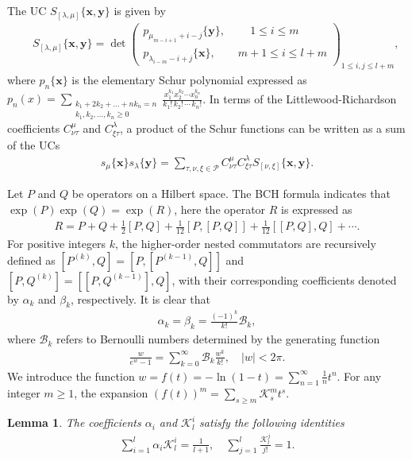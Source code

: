\documentclass[11pt,reqno]{amsart}
\numberwithin{equation}{section}
\newtheorem{lemma}[theorem]{Lemma}
\begin{document}
The UC $S_{[\lambda,\mu]}\{\mathbf{x,y}\}$ is given by
\begin{eqnarray}
&&S_{[\lambda,\mu]}\{\mathbf{x,y}\}=\det
\left(\begin{array}{lll}
p_{\mu_{m-i+1}+i-j}\{\mathbf{y}\},\quad \quad  \ 1\leq i\leq m\\
p_{\lambda_{i-m}-i+j}\{\mathbf{x}\},\quad \quad m+1\leq i\leq l+m
\end{array}\right)_{1\leq i,j\leq l+m},
\end{eqnarray}
where $p_{n}\{\mathbf{x}\}$ is the elementary Schur polynomial expressed as $p_n(x) = \sum\limits_{\substack{k_1 + 2k_2 + \dots + n k_n = n \\ k_1, k_2, \dots, k_n \ge 0}} \frac{x_1^{k_1} x_2^{k_2} \cdots x_n^{k_n}}{k_1! \, k_2! \, \cdots \, k_n!}$. In terms of the Littlewood-Richardson coefficients $C^{\mu}_{\nu\tau}$ and $C^{\lambda}_{\xi\tau}$, a product of the Schur functions can be written as a sum of the UCs
\begin{eqnarray}
s_{\mu}\{\mathbf{x}\}s_{\lambda}\{\mathbf{y}\}=
\sum\limits_{\tau,\nu,\xi\in\mathcal{P}}C^{\mu}_{\nu\tau}C^{\lambda}_{\xi\tau}
S_{[\nu,\xi]}\{\mathbf{x},\mathbf{y}\}.
\end{eqnarray}



 Let $P$ and $Q$ be operators on a Hilbert space. The BCH formula  indicates that $\exp(P)\exp(Q)=\exp(R)$, here the operator $R$ is expressed as
\begin{eqnarray}
R=P+Q+\frac{1}{2}[P,Q]+\frac{1}{12}[P,[P,Q]]+\frac{1}{12}[[P,Q],Q]+\cdots.
\end{eqnarray}
For positive integers $k$, the higher-order nested commutators are recursively defined as $[P^{(k)},Q]=[P,[P^{(k-1)},Q]]$ and $[P,Q^{(k)}]=[[P,Q^{(k-1)}],Q]$, with their corresponding coefficients denoted by $\alpha_{k}$ and $\beta_{k}$, respectively. It is clear that
\begin{eqnarray}
\alpha_{k}=\beta_{k}=\frac{(-1)^{k}}{k!}\mathcal{B}_{k},
\end{eqnarray}
where $\mathcal{B}_{k}$  refers to Bernoulli numbers determined by the generating
function
\begin{eqnarray} \frac{w}{e^{w}-1}=\sum\limits_{k=0}^{\infty}\mathcal{B}_{k}\frac{w^{k}}{k!},
\quad|w|<2\pi.
\end{eqnarray}
We introduce the function $w=f(t)=-\ln(1-t)=\sum\limits_{n=1}^{\infty}\frac{1}{n}t^{n}$. For any integer $m\geq1$, the expansion  $(f(t))^{m}=\sum\limits_{s\geq m}\mathcal{K}_{s}^{m}t^{s}$.
\begin{lemma}
The coefficients $\alpha_{i}$ and $\mathcal{K}_{l}^{i}$ satisfy the following identities
\begin{eqnarray}
\sum\limits_{i=1}^{l}\alpha_{i}\mathcal{K}_{l}^{i}=\frac{1}{l+1},\quad \sum\limits_{j=1}^{l}\frac{\mathcal{K}_{l}^{j}}{j!}=1.
\end{eqnarray}
\end{lemma}
\end{document}
